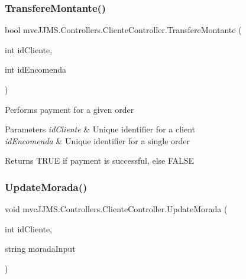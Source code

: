 \subsubsection{\texorpdfstring{Transfere\+Montante()}{TransfereMontante()}}
{\footnotesize\ttfamily bool mvc\+J\+J\+M\+S.\+Controllers.\+Cliente\+Controller.\+Transfere\+Montante (\begin{DoxyParamCaption}\item[{int}]{id\+Cliente,  }\item[{int}]{id\+Encomenda }\end{DoxyParamCaption})\hspace{0.3cm}{\ttfamily [inline]}}



Performs payment for a given order 


\begin{DoxyParams}{Parameters}
{\em id\+Cliente} & Unique identifier for a client\\
\hline
{\em id\+Encomenda} & Unique identifier for a single order\\
\hline
\end{DoxyParams}
\begin{DoxyReturn}{Returns}
T\+R\+UE if payment is successful, else F\+A\+L\+SE
\end{DoxyReturn}
\mbox{\label{classmvc_j_j_m_s_1_1_controllers_1_1_cliente_controller_a27719253428ef9593690de0afdba5596}} 
\subsubsection{\texorpdfstring{Update\+Morada()}{UpdateMorada()}}
{\footnotesize\ttfamily void mvc\+J\+J\+M\+S.\+Controllers.\+Cliente\+Controller.\+Update\+Morada (\begin{DoxyParamCaption}\item[{int}]{id\+Cliente,  }\item[{string}]{morada\+Input }\end{DoxyParamCaption})\hspace{0.3cm}{\ttfamily [inline]}}



